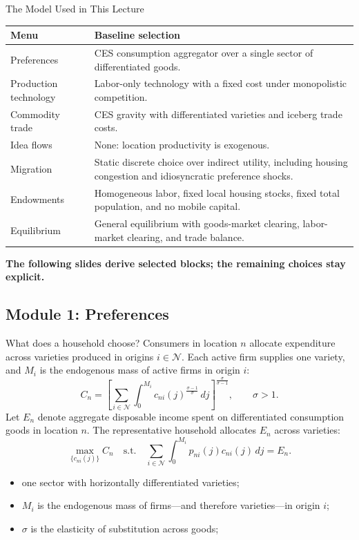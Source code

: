 \documentclass[aspectratio=169,11pt]{beamer}
\newcommand{\hi}[1]{\textcolor{deepred}{\textbf{#1}}}
\begin{document}
\begin{frame}[t]{The Model Used in This Lecture}
  \footnotesize
  \renewcommand{\arraystretch}{1.18}
  \begin{tabular}{
    >{\raggedright\arraybackslash}p{}
    >{\raggedright\arraybackslash}p{}}
    \toprule
    Menu & Baseline selection \\
    \midrule
    Preferences
      & CES consumption aggregator over a single sector of differentiated goods. \\
    Production technology
      & Labor-only technology with a fixed cost under monopolistic competition. \\
    Commodity trade
      & CES gravity with differentiated varieties and iceberg trade costs. \\
    Idea flows
      & None: location productivity is exogenous. \\
    Migration
      & Static discrete choice over indirect utility, including housing congestion
        and idiosyncratic preference shocks. \\
    Endowments
      & Homogeneous labor, fixed local housing stocks, fixed total population,
        and no mobile capital. \\
    Equilibrium
      & General equilibrium with goods-market clearing, labor-market clearing,
        and trade balance. \\
    \bottomrule
  \end{tabular}

  \vfill
  \centering
  \hi{The following slides derive selected blocks; the remaining choices stay explicit.}
\end{frame}

\subsection{Module 1: Preferences}

\begin{frame}{What does a household choose?}
  \small
  Consumers in location \(n\) allocate expenditure across varieties produced
  in origins \(i\in\mathcal N\). Each active firm supplies one variety, and
  \(M_i\) is the endogenous mass of active firms in origin \(i\):
  \[
    C_n=
    \left[
      \sum_{i\in\mathcal N}
      \int_0^{M_i}
      c_{ni}(j)^{\frac{\sigma-1}{\sigma}}\,dj
    \right]^{\frac{\sigma}{\sigma-1}},
    \qquad \sigma>1.
  \]
  Let \(E_n\) denote aggregate disposable income spent on differentiated
  consumption goods in location \(n\). The representative household allocates
  \(E_n\) across varieties:
  \[
    \max_{\{c_{ni}(j)\}} C_n
    \quad\text{s.t.}\quad
    \sum_{i\in\mathcal N}\int_0^{M_i}
      p_{ni}(j)c_{ni}(j)\,dj=E_n.
  \]
  \begin{itemize}
    \item one sector with horizontally differentiated varieties;
    \item \(M_i\) is the endogenous mass of firms---and therefore varieties---in origin \(i\);
    \item \(\sigma\) is the elasticity of substitution across goods;
  \end{itemize}
\end{frame}
\end{document}
